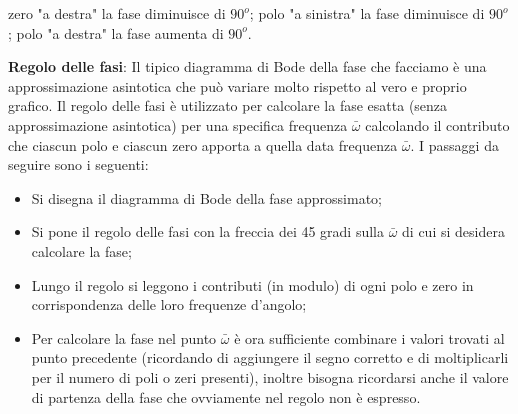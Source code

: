 \begin{landscape}
\begin{multicols*}{3}
\begin{enumerate}
        zero "a destra" la fase diminuisce di $90^o$;\newline
        polo "a sinistra" la fase diminuisce di $90^o$;\newline
        polo "a destra" la fase aumenta di $90^o$.
    \end{enumerate}
    \textbf{Regolo delle fasi}:\newline
    Il tipico diagramma di Bode della fase che facciamo è una approssimazione asintotica che può variare molto rispetto al vero e proprio grafico. Il regolo delle fasi è utilizzato per calcolare la fase esatta (senza approssimazione asintotica) per una specifica frequenza $\bar{\omega}$ calcolando il contributo che ciascun polo e ciascun zero apporta a quella data frequenza $\bar{\omega}$.\newline
    I passaggi da seguire sono i seguenti:
    \begin{itemize}
        \item Si disegna il diagramma di Bode della fase approssimato;
        \item Si pone il regolo delle fasi con la freccia dei 45 gradi sulla $\bar{\omega}$ di cui si desidera calcolare la fase;
        \item Lungo il regolo si leggono i contributi (in modulo) di ogni polo e zero in corrispondenza delle loro frequenze d'angolo;
        \item Per calcolare la fase nel punto $\bar{\omega}$ è ora sufficiente combinare i valori trovati al punto precedente (ricordando di aggiungere il segno corretto e  di moltiplicarli per il numero di poli o zeri presenti), inoltre bisogna ricordarsi anche il valore di partenza della fase che ovviamente nel regolo non è espresso.
    \end{itemize}

\end{multicols*}
\end{landscape}
